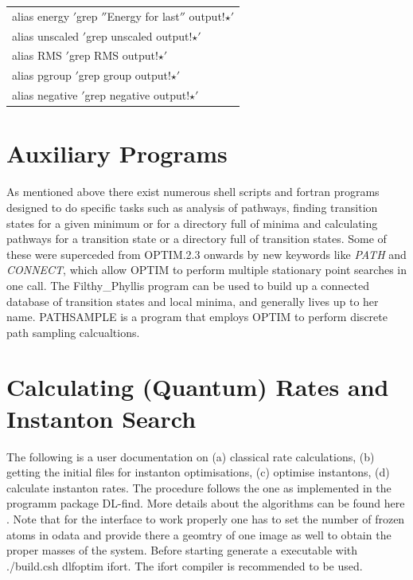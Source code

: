 \documentclass[12pt,a4paper,dvips]{article}
\begin{document}
\medskip
\begin{tabular}{l}
alias energy $'$grep $''$Energy for last$''$ output!$\star$$'$ \\
alias unscaled $'$grep unscaled output!$\star$$'$ \\
alias RMS $'$grep RMS output!$\star$$'$ \\
alias pgroup $'$grep group output!$\star$$'$ \\
alias negative $'$grep negative output!$\star$$'$ \\
\end{tabular}

\section{Auxiliary Programs}
\label{sec:auxiliary}
As mentioned above there exist numerous shell scripts
and fortran programs designed to do specific tasks such as analysis of pathways,
finding transition states for a given minimum or for a directory full of minima and
calculating pathways for a transition state or a directory full of transition states.
Some of these were superceded from OPTIM.2.3 onwards by new keywords like {\it PATH\/}
and {\it CONNECT\/}, which allow OPTIM to perform multiple stationary point searches 
in one call. The Filthy\_Phyllis program can be used to build up a connected database of
transition states and local minima, and generally lives up to her name.
PATHSAMPLE is a program that employs OPTIM to perform discrete path sampling
calcualtions.\cite{Wales02,Wales03}


\section{Calculating (Quantum) Rates and Instanton Search}
\label{sec:instanton}

The following is a user documentation on (a) classical rate calculations, (b) getting the initial files for instanton optimisations,
(c) optimise instantons, (d) calculate instanton rates. The procedure follows the one as implemented in the programm package DL-find.\cite{dlfind} More details about the algorithms can be found here \cite{Rommel2011a,Rommel2011b}.
Note that for the interface to work properly one has to set the number of frozen atoms in odata and provide there a geomtry of one image as well to obtain the proper masses of the system.
Before starting generate a executable with ./build.csh dlfoptim ifort. The ifort compiler is recommended to be used.
\end{document}
